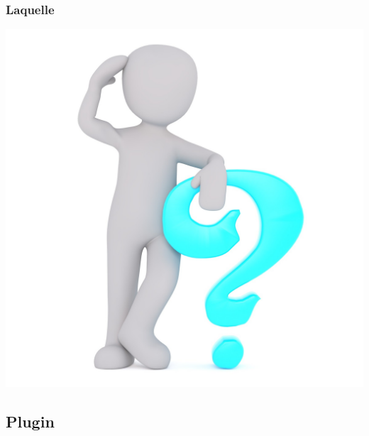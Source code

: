 \documentclass[hyperref={bookmarks=false},aspectratio=169]{beamer}
\begin{document}
\begin{frame}
\frametitle{Laquelle}

\vfill
\begin{center} \includegraphics[scale=0.6]{./figures/int.jpg} \\[1cm] \end{center}
\vfill

\end{frame}

\subsection{Plugin}


\end{document}
